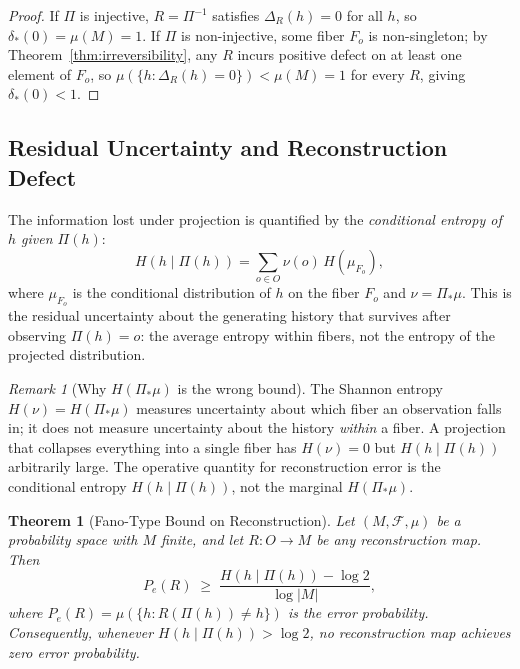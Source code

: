 \documentclass[12pt,a4paper]{article}
\newtheorem{theorem}{Theorem}[section]
\theoremstyle{remark}
\newtheorem{remark}{Remark}[section]
\theoremstyle{definition}
\begin{document}
\begin{proof}
If $\Pi$ is injective, $R = \Pi^{-1}$ satisfies $\Delta_R(h) = 0$ for all
$h$, so $\delta_*(0) = \mu(M) = 1$. If $\Pi$ is non-injective, some fiber
$F_o$ is non-singleton; by Theorem~\ref{thm:irreversibility}, any $R$
incurs positive defect on at least one element of $F_o$, so
$\mu(\{h : \Delta_R(h) = 0\}) < \mu(M) = 1$ for every $R$, giving
$\delta_*(0) < 1$.
\end{proof}

\subsection{Residual Uncertainty and Reconstruction Defect}

The information lost under projection is quantified by the
\emph{conditional entropy of $h$ given $\Pi(h)$}:
\begin{equation}
  H(h \mid \Pi(h)) = \sum_{o \in O} \nu(o)\, H(\mu_{F_o}),
  \label{eq:cond_entropy}
\end{equation}
where $\mu_{F_o}$ is the conditional distribution of $h$ on the fiber
$F_o$ and $\nu = \Pi_*\mu$. This is the residual uncertainty about
the generating history that survives after observing $\Pi(h) = o$:
the average entropy within fibers, not the entropy of the projected
distribution.

\begin{remark}[Why $H(\Pi_*\mu)$ is the wrong bound]
The Shannon entropy $H(\nu) = H(\Pi_*\mu)$ measures uncertainty about
which fiber an observation falls in; it does not measure uncertainty about
the history \emph{within} a fiber. A projection that collapses everything
into a single fiber has $H(\nu) = 0$ but $H(h \mid \Pi(h))$ arbitrarily
large. The operative quantity for reconstruction error is the conditional
entropy $H(h \mid \Pi(h))$, not the marginal $H(\Pi_*\mu)$.
\end{remark}

\begin{theorem}[Fano-Type Bound on Reconstruction]
\label{thm:entropy_bound}
Let $(M, \mathcal{F}, \mu)$ be a probability space with $M$ finite, and
let $R : O \to M$ be any reconstruction map. Then
\begin{equation}
  P_e(R) \;\geq\; \frac{H(h \mid \Pi(h)) - \log 2}{\log|M|},
  \label{eq:fano}
\end{equation}
where $P_e(R) = \mu(\{h : R(\Pi(h)) \neq h\})$ is the error probability.
Consequently, whenever $H(h \mid \Pi(h)) > \log 2$, no reconstruction map
achieves zero error probability.
\end{theorem}
\end{document}
